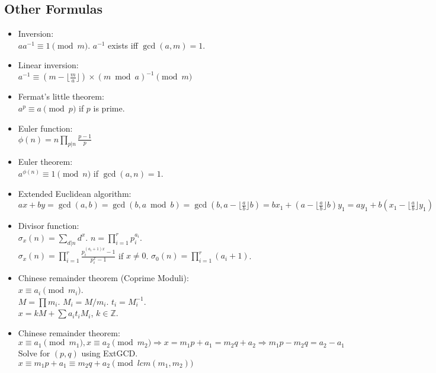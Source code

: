 \documentclass[a4paper,10pt,twocolumn,oneside]{article}
\begin{document}
\subsection{Other Formulas}
{\normalsize \begin{itemize}
    \item Inversion:\\ $aa^{-1} \equiv 1 \pmod{m}$. $a^{-1}$ exists iff $\gcd(a,m)=1$.
    
    \item Linear inversion:\\ $a^{-1} \equiv (m - \lfloor\frac{m}{a}\rfloor) \times (m \bmod a)^{-1} \pmod{m}$
    
    \item Fermat's little theorem:\\ $a^p \equiv a \pmod{p}$ if $p$ is prime.
    
    \item Euler function:\\ $\phi(n)=n \prod_{p|n} \frac{p-1}{p}$
    
    \item Euler theorem:\\ $a^{\phi(n)} \equiv 1 \pmod{n}$ if $\gcd(a,n) = 1$.
    
    \item Extended Euclidean algorithm:\\
    $ax+by=\gcd(a,b)=\gcd(b, a \bmod b)=\gcd(b, a-\lfloor\frac{a}{b}\rfloor b)=bx_1+(a-\lfloor\frac{a}{b}\rfloor b)y_1=ay_1+b(x_1-\lfloor\frac{a}{b}\rfloor y_1)$
    
    \item Divisor function:\\ $\sigma_x(n) = \sum_{d|n}d^x$. $n=\prod_{i=1}^r p_i^{a_i}$.\\ $\sigma_x(n)=\prod_{i=1}^r \frac{p_i^{(a_i+1)x}-1}{p_i^x-1}$ if $x \neq 0$. $\sigma_0(n)=\prod_{i=1}^r (a_i+1)$.
    
    \item Chinese remainder theorem (Coprime Moduli):\\ $x \equiv a_i \pmod{m_i}$.\\
        $M=\prod m_i$. $M_i=M/m_i$. $t_i=M_i^{-1}$.\\
        $x = kM + \sum a_i t_i M_i$, $k \in \mathbb{Z}$.
        
    \item Chinese remainder theorem:\\
    $x \equiv a_1 \pmod{m_1}, x \equiv a_2 \pmod{m_2} \Rightarrow x = m_1 p + a_1 = m_2 q + a_2 \Rightarrow m_1 p - m_2 q = a_2 - a_1$\\
    Solve for $(p, q)$ using ExtGCD.\\
    $x \equiv m_1 p + a_1 \equiv m_2 q + a_2 \pmod{lcm(m_1, m_2)}$
    

\end{itemize}}
\end{document}
